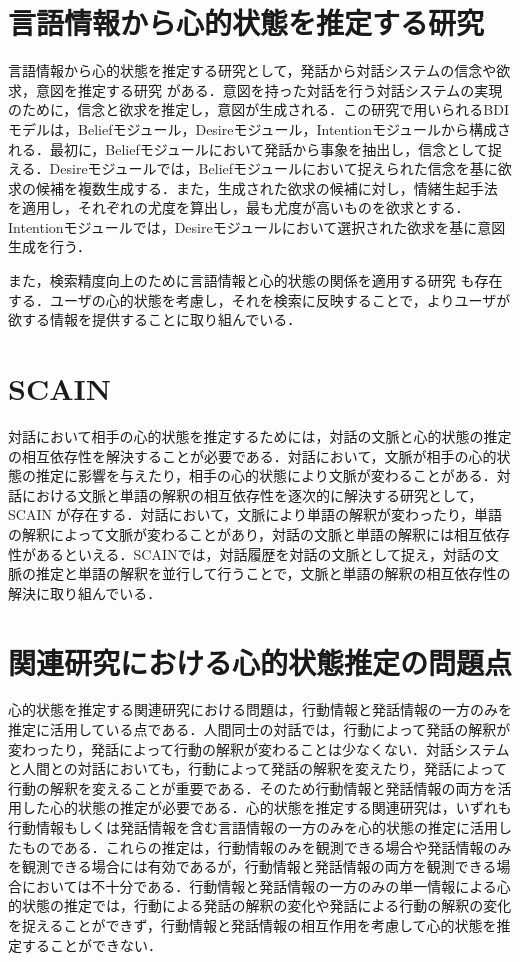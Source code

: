 \section{言語情報から心的状態を推定する研究}
\par
言語情報から心的状態を推定する研究として，発話から対話システムの信念や欲求，意図を推定する研究 \cite{高橋拓誠2015bdi}がある．意図を持った対話を行う対話システムの実現のために，信念と欲求を推定し，意図が生成される．この研究で用いられるBDIモデルは，Beliefモジュール，Desireモジュール，Intentionモジュールから構成される．最初に，Beliefモジュールにおいて発話から事象を抽出し，信念として捉える．Desireモジュールでは，Beliefモジュールにおいて捉えられた信念を基に欲求の候補を複数生成する．また，生成された欲求の候補に対し，情緒生起手法 \cite{2002}を適用し，それぞれの尤度を算出し，最も尤度が高いものを欲求とする．Intentionモジュールでは，Desireモジュールにおいて選択された欲求を基に意図生成を行う．

\par
また，検索精度向上のために言語情報と心的状態の関係を適用する研究 \cite{10.1007/978-3-642-02481-8_4}も存在する．ユーザの心的状態を考慮し，それを検索に反映することで，よりユーザが欲する情報を提供することに取り組んでいる．

\section{SCAIN}
対話において相手の心的状態を推定するためには，対話の文脈と心的状態の推定の相互依存性を解決することが必要である．対話において，文脈が相手の心的状態の推定に影響を与えたり，相手の心的状態により文脈が変わることがある．対話における文脈と単語の解釈の相互依存性を逐次的に解決する研究として，SCAIN \cite{takimoto2020slaminspired}が存在する．対話において，文脈により単語の解釈が変わったり，単語の解釈によって文脈が変わることがあり，対話の文脈と単語の解釈には相互依存性があるといえる．SCAINでは，対話履歴を対話の文脈として捉え，対話の文脈の推定と単語の解釈を並行して行うことで，文脈と単語の解釈の相互依存性の解決に取り組んでいる．

\section{関連研究における心的状態推定の問題点}
\par
心的状態を推定する関連研究における問題は，行動情報と発話情報の一方のみを推定に活用している点である．人間同士の対話では，行動によって発話の解釈が変わったり，発話によって行動の解釈が変わることは少なくない．対話システムと人間との対話においても，行動によって発話の解釈を変えたり，発話によって行動の解釈を変えることが重要である．そのため行動情報と発話情報の両方を活用した心的状態の推定が必要である．心的状態を推定する関連研究は，いずれも行動情報もしくは発話情報を含む言語情報の一方のみを心的状態の推定に活用したものである．これらの推定は，行動情報のみを観測できる場合や発話情報のみを観測できる場合には有効であるが，行動情報と発話情報の両方を観測できる場合においては不十分である．行動情報と発話情報の一方のみの単一情報による心的状態の推定では，行動による発話の解釈の変化や発話による行動の解釈の変化を捉えることができず，行動情報と発話情報の相互作用を考慮して心的状態を推定することができない．

